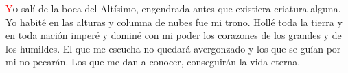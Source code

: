 \lettrine[lines=2]{\textcolor{red}{Y}}o salí de la boca del Altísimo, engendrada antes que existiera criatura alguna. Yo habité en las
alturas y columna de nubes fue mi trono. Hollé toda la tierra y en toda nación imperé y dominé con mi poder los corazones de los grandes
y de los humildes. El que me escucha no quedará avergonzado y los que se guían por mi no pecarán. Los que me dan a conocer, conseguirán
la vida eterna.\cite{remigio-misal}